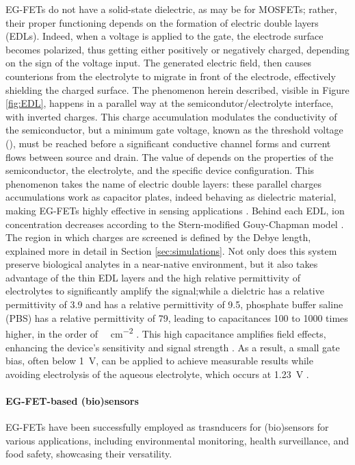 EG-FETs do not have a solid-state dielectric, as  may be for MOSFETs; rather, their proper functioning depends on the formation of electric double layers (EDLs). Indeed, when a voltage is applied to the gate, the electrode surface becomes polarized, thus getting either positively or negatively charged, depending on the sign of the voltage input. The generated electric field, then causes counterions from the electrolyte to migrate in front of the electrode, effectively shielding the charged surface. The phenomenon herein described, visible in Figure \ref{fig:EDL}, happens in a parallel way at the semicondutor/electrolyte interface, with inverted charges. This charge accumulation modulates the conductivity of the semiconductor, but a minimum gate voltage, known as the threshold voltage (\vth{}), must be reached before a significant conductive channel forms and current flows between source and drain. The value of \vth{} depends on the properties of the semiconductor, the electrolyte, and the specific device configuration. This phenomenon takes the name of electric double layers: these parallel charges accumulations work as capacitor plates, indeed behaving as dielectric material, making EG-FETs highly effective in sensing applications \citep{kimElectrolyteGated2013, wangElectrolytic2016}. Behind each EDL, ion concentration decreases according to the Stern-modified Gouy-Chapman model \citep{oldhamGouy2008}. The region in which charges are screened is defined by the Debye length, explained more in detail in Section \ref{sec:simulations}.
Not only does this system preserve biological analytes in a near-native environment, but it also takes advantage of the thin EDL layers and the high relative permittivity of electrolytes to significantly amplify the signal;while a  dielctric has a relative permittivity of 3.9 and  has a relative permittivity of 9.5, phosphate buffer saline (PBS) has a relative permittivity of 79, leading to capacitances 100 to 1000 times higher, in the order of \SI{}{\uF\per\cm\squared} \citep{shkodraElectrolytegated2021,velickyElectrolyte2021}. This high capacitance amplifies field effects, enhancing the device's sensitivity and signal strength \citep{shkodraElectrolytegated2021}. As a result, a small gate bias, often below \SI{1}{V}, can be applied to achieve measurable results while avoiding electrolysis of the aqueous electrolyte, which occurs at \SI{1.23}{V} \citep{suoWaterinsalt2015}.

\paragraph{EG-FET-based (bio)sensors}
EG-FETs have been successfully employed as trasnducers for (bio)sensors for various applications, including environmental monitoring, health surveillance, and food safety, showcasing their versatility.

